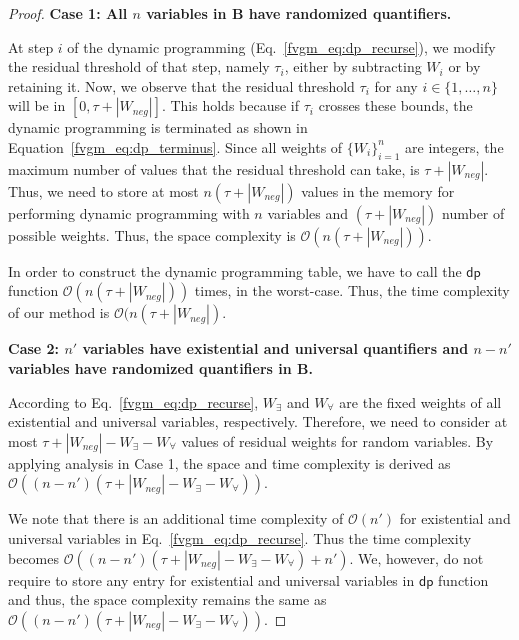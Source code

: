 \begin{proof}
	\textbf{Case 1: All $n$ variables in $\mathbf{B}$ have randomized quantifiers.}
	
	At step $i$ of the dynamic programming (Eq.~\eqref{fvgm_eq:dp_recurse}), we modify the residual threshold of that step, namely $\tau_i$, either by subtracting $W_i$ or by retaining it.
	Now, we observe that the residual threshold $\tau_i$ for any $i \in \lbrace1,\ldots,n\rbrace$ will be in $[0, \tau+|W_{neg}|]$. This holds because if $\tau_i$ crosses these bounds, the dynamic programming is terminated as shown in Equation~\eqref{fvgm_eq:dp_terminus}.
	Since all weights of $\{W_i\}_{i=1}^{n}$ are integers, the maximum number of values that the residual threshold can take, is $ \tau + |W_{neg}| $.
	Thus, we need to store at most $ n(\tau + |W_{neg}|)$ values in the memory for performing dynamic programming with $n$ variables and $ (\tau + |W_{neg}|) $ number of possible weights.
	Thus, the space complexity  is $ \mathcal{O}(n(\tau + |W_{neg}|)) $.  
	
	In order to construct the dynamic programming table, we have to call the $\mathsf{dp}$ function $ \mathcal{O}(n(\tau + |W_{neg}|)) $ times, in the worst-case.
	Thus, the time complexity of our method is $ \mathcal{O}(n(\tau + |W_{neg}|) $.
	
	
	\textbf{Case 2: $n'$ variables have existential and universal quantifiers and $n-n'$ variables have randomized quantifiers in $\mathbf{B}$.}
	
	According to Eq.~\eqref{fvgm_eq:dp_recurse}, $ W_\exists $ and $ W_\forall $ are the fixed weights of all existential and universal variables, respectively. Therefore, we need to consider at most $ \tau + |W_{neg}| -  W_\exists - W_\forall $ values of residual weights for random variables. By applying analysis in Case 1, the space and time complexity is derived as $ \mathcal{O}((n - n')(\tau + |W_{neg}| - W_{\exists} - W_{\forall})) $. 
	
	We note that there is an additional time complexity of $ \mathcal{O}(n') $ for existential and universal variables in Eq.~\eqref{fvgm_eq:dp_recurse}. Thus the time complexity becomes $ \mathcal{O}((n - n')(\tau + |W_{neg}| - W_{\exists} - W_{\forall}) + n') $. We, however, do not require to store any entry for existential and universal variables in $ \mathsf{dp} $  function and thus, the space complexity remains the same as $ \mathcal{O}((n - n')(\tau + |W_{neg}| - W_{\exists} - W_{\forall})) $.
\end{proof}
 



